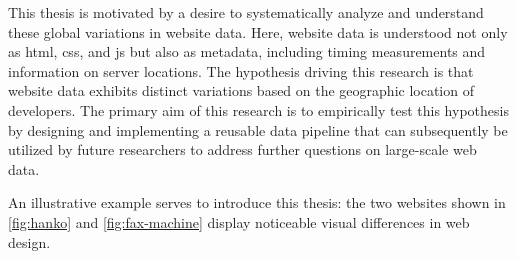 This thesis is motivated by a desire to systematically analyze and understand these global variations in website data.
Here, website data is understood not only as \ac{html}, \ac{css}, and \ac{js} but also as metadata, including timing measurements and information on server locations.
The hypothesis driving this research is that website data exhibits distinct variations based on the geographic location of developers.
The primary aim of this research is to empirically test this hypothesis by designing and implementing a reusable data pipeline that can subsequently be utilized by future researchers to address further questions on large-scale web data.

An illustrative example serves to introduce this thesis: the two websites shown in \cref{fig:hanko} and \cref{fig:fax-machine} display noticeable visual differences in web design.

